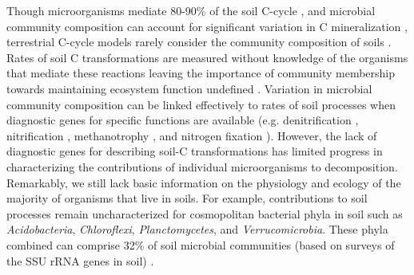 Though microorganisms mediate 80-90\% of the soil C-cycle
\citep{ColemanCrossley_1996,Nannipieri_2003}, and microbial community
composition can account for significant variation in C mineralization
\citep{Strickland_2009}, terrestrial C-cycle models rarely consider the
community composition of soils \citep{Zak2006,Reed2007}. Rates of soil
C transformations are measured without knowledge of the organisms that mediate
these reactions \citep{Nannipieri_2003} leaving the importance of community
membership towards maintaining ecosystem function undefined
\citep{Nannipieri_2003,Schimel_2012,Allison_2008}. Variation in microbial
community composition can be linked effectively to rates of soil processes when
diagnostic genes for specific functions are available (e.g. denitrification
\citep{Cavigelli2000}, nitrification \citep{Carney2004,Hawkes2005,Webster2005},
methanotrophy \citep{Gulledge1997}, and nitrogen fixation \citep{Hsu2009}).
However, the lack of diagnostic genes for describing soil-C transformations has
limited progress in characterizing the contributions of individual microorganisms to
decomposition. Remarkably, we still lack basic information on the physiology
and ecology of the majority of organisms that live in soils. For example,
contributions to soil processes remain uncharacterized for 
cosmopolitan bacterial phyla in soil such as \textit{Acidobacteria},
\textit{Chloroflexi}, \textit{Planctomycetes}, and \textit{Verrucomicrobia}.
These phyla combined can comprise 32\% of soil microbial communities (based on
surveys of the SSU rRNA genes in soil) \citep{Janssen2006,Buckley2002}. 

